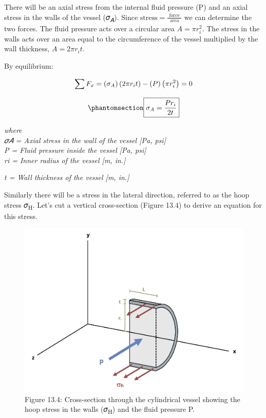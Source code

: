 \documentclass[
  letterpaper,
  DIV=11,
  numbers=noendperiod]{scrreprt}
\theoremstyle{definition}
\theoremstyle{remark}
\begin{document}
There will be an axial stress from the internal fluid pressure (P) and
an axial stress in the walls of the vessel (𝜎\textsubscript{𝐴}). Since
\(\text{stress}=\frac{\text { force }}{\text { area }}\) we can
determine the two forces. The fluid pressure acts over a circular area
\(A=\pi r_i^2\). The stress in the walls acts over an area equal to the
circumference of the vessel multiplied by the wall thickness,
\(A=2 \pi r_i t\).

By equilibrium:

\[
\sum F_x=\left(\sigma_A\right)\left(2 \pi r_i t\right)-(P)\left(\pi r_i^2\right)=0 \\
\]

\begin{equation}\phantomsection\label{eq-13.1}{
\boxed{\sigma_A=\frac{P r_i}{2 t}}
}\end{equation}

\emph{where}\\
\emph{𝜎𝐴 = Axial stress in the wall of the vessel {[}Pa, psi{]}}\\
\emph{P = Fluid pressure inside the vessel {[}Pa, psi{]}}\\
\emph{ri = Inner radius of the vessel {[}m, in.{]}}

\emph{t = Wall thickness of the vessel {[}m, in.{]}}

Similarly there will be a stress in the lateral direction, referred to
as the hoop stress 𝜎\textsubscript{H}. Let's cut a vertical
cross-section (Figure 13.4) to derive an equation for this stress.

\begin{figure}[H]

{\centering \includegraphics[width=5.30208in,height=\textheight]{images/CH13 PNGs/figure 13.4.png}

}

\caption{Figure 13.4: Cross-section through the cylindrical vessel
showing the hoop stress in the walls (𝜎\textsubscript{H}) and the fluid
pressure P.}

\end{figure}%
\end{document}
